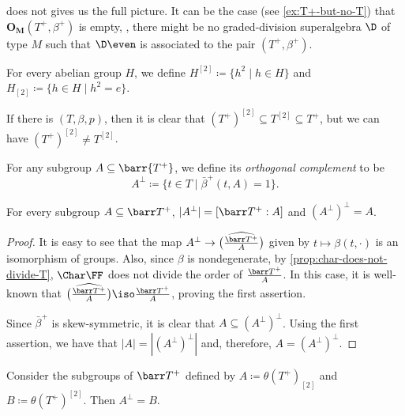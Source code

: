  does not gives us the full picture. 
It can be the case (see \cref{ex:T+-but-no-T}) that $\mathbf{O_M}(T^+, \beta^+)$ is empty, \ie, there might be no graded-division superalgebra $\D$ of type $M$ such that $\D\even$ is associated to the pair $(T^+, \beta^+)$.

\begin{defi}
	For every abelian group $H$, we define $H^{[2]} \coloneqq \{h^2 \mid h\in H\}$ and $H_{[2]} \coloneqq \{h\in H \mid h^2 = e \}$.
\end{defi}

If there is $(T, \beta, p)$, then it is clear that $(T^+)^{[2]} \subseteq T^{[2]} \subseteq T^+$, but we can have $(T^+)^{[2]} \neq T^{[2]}$. 

\begin{defi} 
    For any subgroup $A\subseteq \barr{T^+}$, we define its \emph{orthogonal complement} to be
    \[
        A^\perp \coloneqq \{t\in T\mid \bar\beta^+ (t, A) =1\}.
    \]
\end{defi}

\begin{lemma}
    For every subgroup $A \subseteq \barr T^+$, $|A^\perp| = [\barr T^+ : A]$ and $(A^\perp)^\perp = A$.
\end{lemma}

\begin{proof}
    It is easy to see that the map $A^\perp \to \widehat{\left( \frac{\barr T^+}{A}\right)}$ given by $t \mapsto \beta(t, \cdot)$ is an isomorphism of groups. 
    Also, since $\beta$ is nondegenerate, by \cref{prop:char-does-not-divide-T},  $\Char \FF$ does not divide the order of $\frac{\barr T^+}{A}$. 
    In this case, it is well-known that $\widehat{\left( \frac{\barr T^+}{A}\right)} \iso \frac{\barr T^+}{A}$, proving the first assertion.

    Since $\bar\beta^+$ is skew-symmetric, it is clear that $A \subseteq (A^\perp)^\perp$. 
    Using the first assertion, we have that $|A| = |(A^\perp)^\perp|$ and, therefore, $A = (A^\perp)^\perp$.
\end{proof}


\begin{prop}\label{prop:small-perp}
    Consider the subgroups of $\barr T^+$ defined by $A \coloneqq \theta(T^+)_{[2]}$ and $B \coloneqq \theta(T^+)^{[2]}$. 
    Then $A^\perp = B$.
\end{prop}

